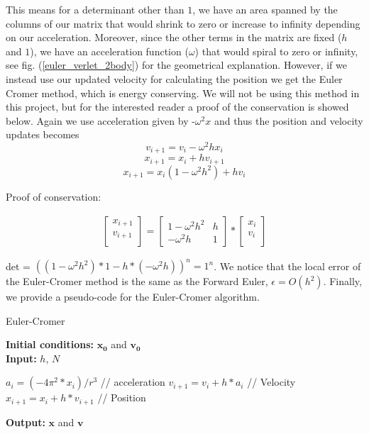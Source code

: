 \documentclass[a4paper]{article}
\begin{document}
\begin{appendix}
This means for a determinant other than $1$, we have an area spanned by the columns of our matrix that would shrink to zero or increase to infinity depending on our acceleration. Moreover, since the other terms in the matrix are fixed ($h$ and $1$), we have an acceleration function ($\omega$) that would spiral to zero or infinity, see fig. (\ref{euler_verlet_2body}) for the geometrical explanation. However, if we instead use our updated velocity for calculating the position we get the Euler Cromer method, which is energy conserving. We will not be using this method in this project, but for the interested reader a proof of the conservation is showed below. Again we use acceleration given by -$\omega^2x$ and thus the position and velocity updates becomes
\begin{equation}
v_{i+1} = v_{i} - \omega^2hx_{i}
\end{equation}
\begin{equation}
x_{i+1} = x_{i} + hv_{i+1}
\end{equation}
\begin{equation}
x_{i+1} = x_{i}(1 - \omega^2h^2) + hv_{i}
\end{equation}

Proof of conservation:

\begin{align}
    \begin{bmatrix}
    x_{i+1} \\ v_{i+1} \\
  \end{bmatrix}
  =
    \begin{bmatrix}
        1 - \omega^2h^2 & h \\
        - \omega^2h & 1 
    \end{bmatrix}
    *
    \begin{bmatrix}
    x_i \\ v_i \\
  \end{bmatrix}
\end{align}


det = $( (1 - \omega^2h^2) * 1 - h* (-\omega^2h))^{n} = 1^n$. We notice that the local error of the Euler-Cromer method is the same as the Forward Euler, $\epsilon = O(h^2)$. Finally, we provide a pseudo-code for the Euler-Cromer algorithm.

\begin{algorithm}[H]
\caption{Euler-Cromer}
\textbf{Initial conditions:} $\mathbf{x_0}$ and $\mathbf{v_0}$ \\
\textbf{Input:} $h$, $N$
\begin{algorithmic}[1]
\State $a_{i} = (-4\pi^2 * x_i) / r^3 $ \qquad// acceleration 
\State $v_{i+1}=v_{i} + h*a_{i}$ \qquad// Velocity
\State $x_{i+1}=x_{i} + h*v_{i+1}$ \qquad// Position
\EndFor
\EndWhile
\end{algorithmic}
\textbf{Output:} $\mathbf{x}$ and $\mathbf{v}$
\label{euler-cromer}
\end{algorithm}



\end{appendix}
\end{document}
